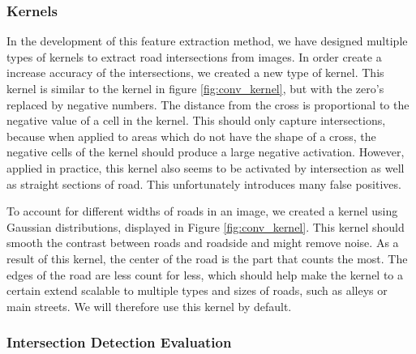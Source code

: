 \subsubsection{Kernels}
In the development of this feature extraction method, we have designed multiple types of kernels to extract road intersections from images. In order create a increase accuracy of the intersections, we created a new type of kernel. This kernel is similar to the kernel in figure \ref{fig:conv_kernel}, but with the zero's replaced by negative numbers. The distance from the cross is proportional to the negative value of a cell in the kernel. This should only capture intersections, because when applied to areas which do not have the shape of a cross, the negative cells of the kernel should produce a large negative activation. However, applied in practice, this kernel also seems to be activated by intersection as well as straight sections of road. This unfortunately introduces many false positives.

To account for different widths of roads in an image, we created a kernel using Gaussian distributions, displayed in Figure \ref{fig:conv_kernel}. This kernel should smooth
the contrast between roads and roadside and might remove noise. As a result of
this kernel, the center of the road is the part that counts the most. The edges
of the road are less count for less, which should help make the kernel to a certain extend scalable
to multiple types and sizes of roads, such as alleys or main streets. We will therefore use this kernel by default.

\subsubsection{Intersection Detection Evaluation}

